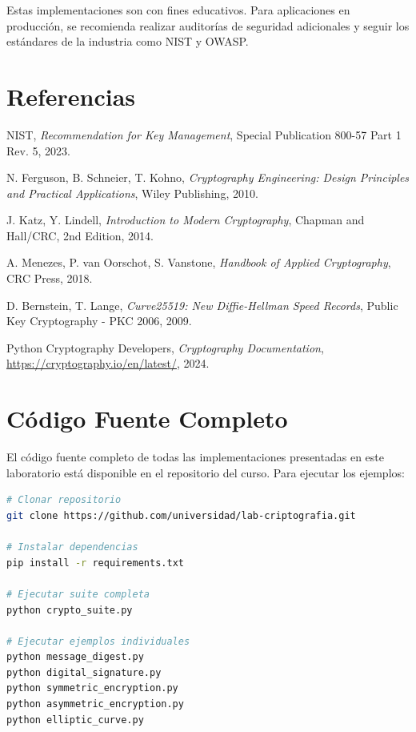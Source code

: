 \documentclass[12pt,a4paper]{article}
\begin{document}
\begin{securityalert}
    Estas implementaciones son con fines educativos. Para aplicaciones en producción, se recomienda realizar auditorías de seguridad adicionales y seguir los estándares de la industria como NIST y OWASP.
\end{securityalert}

\section{Referencias}

\begin{thebibliography}{9}

    NIST,
    \textit{Recommendation for Key Management},
    Special Publication 800-57 Part 1 Rev. 5,
    2023.

    N. Ferguson, B. Schneier, T. Kohno,
    \textit{Cryptography Engineering: Design Principles and Practical Applications},
    Wiley Publishing,
    2010.

    J. Katz, Y. Lindell,
    \textit{Introduction to Modern Cryptography},
    Chapman and Hall/CRC,
    2nd Edition, 2014.

    A. Menezes, P. van Oorschot, S. Vanstone,
    \textit{Handbook of Applied Cryptography},
    CRC Press,
    2018.

    D. Bernstein, T. Lange,
    \textit{Curve25519: New Diffie-Hellman Speed Records},
    Public Key Cryptography - PKC 2006,
    2009.

    Python Cryptography Developers,
    \textit{Cryptography Documentation},
    \url{https://cryptography.io/en/latest/},
    2024.

\end{thebibliography}

\appendix

\section{Código Fuente Completo}

El código fuente completo de todas las implementaciones presentadas en este
laboratorio está disponible en el repositorio del curso. Para ejecutar los
ejemplos:

\begin{lstlisting}[language=bash, caption=Instalación y ejecución]
# Clonar repositorio
git clone https://github.com/universidad/lab-criptografia.git

# Instalar dependencias
pip install -r requirements.txt

# Ejecutar suite completa
python crypto_suite.py

# Ejecutar ejemplos individuales
python message_digest.py
python digital_signature.py
python symmetric_encryption.py
python asymmetric_encryption.py
python elliptic_curve.py
\end{lstlisting}
\end{document}
